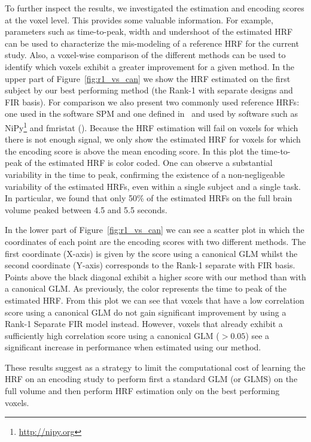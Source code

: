To further inspect the results, we investigated the estimation and
encoding scores at the voxel level. This provides some valuable information.
For example, parameters such as time-to-peak, width and undershoot of the
estimated HRF can be used to characterize the mis-modeling of a reference HRF
for the current study. Also, a voxel-wise comparison of the different methods
can be used to identify which voxels exhibit a greater improvement for a given
method. In the upper part of Figure~\ref{fig:r1_vs_can} we show the HRF
estimated on the first subject by our best performing method (the Rank-1 with separate designs and
FIR basis). For comparison we also present two commonly used
reference HRFs: one used in the software SPM and one defined in~\cite[auditory
study]{Glover1999} and used by software such as
NiPy\footnote{\href{http://nipy.org}{http://nipy.org}}  and
fmristat (). Because the HRF
estimation will fail on voxels for which there is not enough signal, we only
show the estimated HRF for voxels for which the encoding score is above the
mean encoding score. In this plot the time-to-peak of the estimated HRF is
color coded. One can observe a substantial variability in the time to peak,
confirming the existence of a non-negligeable variability
of the estimated HRFs, even within a single subject and a single task. In
particular, we found that only 50\% of the estimated HRFs on the full brain volume 
peaked between 4.5 and 5.5 seconds.

In the lower part of Figure~\ref{fig:r1_vs_can} we can see a scatter plot in which the
coordinates of each point are the encoding scores with two
different methods. The first coordinate (X-axis) is given by the score using a
canonical GLM whilst the second coordinate (Y-axis) corresponds to the Rank-1 separate
with FIR basis. Points above the black diagonal
exhibit a higher score with our method than with a canonical GLM. As
previously, the color represents the time to peak of the estimated HRF.
From this plot we can see that voxels that have a low correlation
score using a canonical GLM do not gain significant
improvement by using a Rank-1 Separate FIR model instead. However, voxels that
already exhibit a sufficiently high correlation score using a canonical
GLM ($> 0.05$) see a significant increase in performance when estimated using
our method.



These results suggest as a strategy to limit the computational cost of learning the HRF
on an encoding study to perform first a standard GLM (or GLMS) on the full
volume and then perform HRF estimation only on the best performing voxels.


